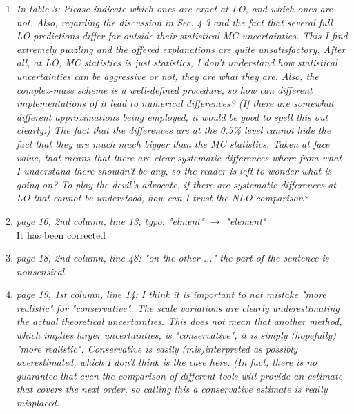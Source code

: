 \documentclass{report}
\begin{document}
\begin{enumerate}
\item \emph{In table 3: Please indicate which ones are exact at LO, and which ones are not. Also, regarding the discussion in Sec. 4.3 and the fact that several full LO
predictions differ far outside their statistical MC uncertainties. This I find
extremely puzzling and the offered explanations are quite unsatisfactory. After
all, at LO, MC statistics is just statistics, I don't understand how statistical
uncertainties can be aggressive or not, they are what they are.
Also, the complex-mass scheme is a well-defined procedure, so how can different implementations of it lead to numerical differences? (If there are somewhat different approximations being employed, it would be good to spell this out clearly.) The fact that the differences are at the 0.5\% level
cannot hide the fact that they are much much bigger than the MC statistics.
Taken at face value, that means that there are clear systematic differences where from what I understand there shouldn't be any, so the reader is left to wonder what is going on? To play the devil's advocate, if there are systematic differences at LO that cannot be understood, how can I trust the NLO comparison?}

\item \emph{ page 16, 2nd column, line 13, typo: "elment" $\to$ "element"}\\
    It has been corrected

\item \emph{ page 18, 2nd column, line 48: "on the other ..." the part of the sentence is
    nonsensical.}
\item \emph{page 19, 1st column, line 14:
I think it is important to not mistake "more realistic" for "conservative". The
scale variations are clearly underestimating the actual theoretical uncertainties. This does not mean that another method, which implies larger uncertainties, is "conservative", it is simply (hopefully) "more realistic". Conservative is easily (mis)interpreted as possibly overestimated, which I don't think is the case here. (In fact, there is no guarantee that even the comparison of different tools will provide an estimate that covers the next order, so calling this a conservative estimate is really misplaced.}
\end{enumerate}
\end{document}
